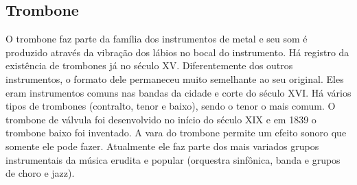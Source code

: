 \subsection*{Trombone}

O trombone faz parte da família dos instrumentos de metal e
seu som é produzido através da vibração dos lábios no bocal do
instrumento. Há registro da existência de trombones já no século
XV. Diferentemente dos outros instrumentos, o formato dele permaneceu
muito semelhante ao seu original. Eles eram instrumentos comuns nas
bandas da cidade e corte do século XVI. Há vários tipos de trombones
(contralto, tenor e baixo), sendo o tenor o mais comum. O trombone de
válvula foi desenvolvido no início do século XIX e em 1839 o trombone
baixo foi inventado. A vara do trombone permite um efeito sonoro que
somente ele pode fazer. Atualmente ele faz parte dos mais variados
grupos instrumentais da música erudita e popular (orquestra sinfônica,
banda e grupos de choro e jazz).